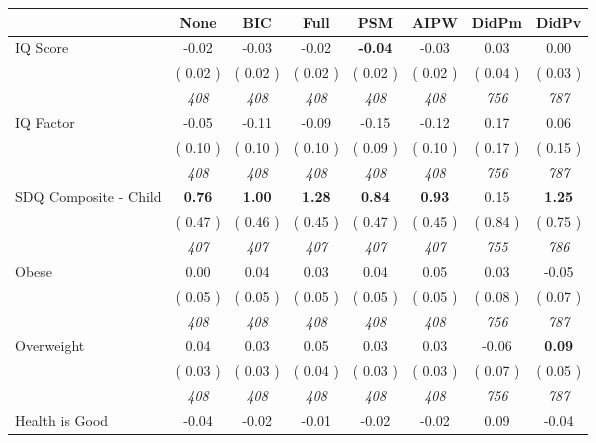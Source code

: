 \begin{tabular}{l c c c c c c c}
\toprule
 & None & BIC & Full & PSM & AIPW & DidPm & DidPv \\
\midrule
IQ Score &     -0.02 &     -0.03 &     -0.02 & \textbf{    -0.04} &     -0.03 &      0.03 &      0.00 \\
& (     0.02 ) & (     0.02 ) & (     0.02 ) & (     0.02 ) & (     0.02 ) & (     0.04 ) & (     0.03 ) \\
& \textit{ 408 } & \textit{ 408 } & \textit{ 408 } & \textit{ 408 } & \textit{ 408 } & \textit{ 756 } & \textit{ 787 } \\
IQ Factor &     -0.05 &     -0.11 &     -0.09 &     -0.15 &     -0.12 &      0.17 &      0.06 \\
& (     0.10 ) & (     0.10 ) & (     0.10 ) & (     0.09 ) & (     0.10 ) & (     0.17 ) & (     0.15 ) \\
& \textit{ 408 } & \textit{ 408 } & \textit{ 408 } & \textit{ 408 } & \textit{ 408 } & \textit{ 756 } & \textit{ 787 } \\
SDQ Composite - Child & \textbf{      0.76 } & \textbf{      1.00 } & \textbf{      1.28 } & \textbf{     0.84} & \textbf{     0.93} &      0.15 & \textbf{      1.25 } \\
& (     0.47 ) & (     0.46 ) & (     0.45 ) & (     0.47 ) & (     0.45 ) & (     0.84 ) & (     0.75 ) \\
& \textit{ 407 } & \textit{ 407 } & \textit{ 407 } & \textit{ 407 } & \textit{ 407 } & \textit{ 755 } & \textit{ 786 } \\
Obese &      0.00 &      0.04 &      0.03 &      0.04 &      0.05 &      0.03 &     -0.05 \\
& (     0.05 ) & (     0.05 ) & (     0.05 ) & (     0.05 ) & (     0.05 ) & (     0.08 ) & (     0.07 ) \\
& \textit{ 408 } & \textit{ 408 } & \textit{ 408 } & \textit{ 408 } & \textit{ 408 } & \textit{ 756 } & \textit{ 787 } \\
Overweight &      0.04 &      0.03 &      0.05 &      0.03 &      0.03 &     -0.06 & \textbf{      0.09 } \\
& (     0.03 ) & (     0.03 ) & (     0.04 ) & (     0.03 ) & (     0.03 ) & (     0.07 ) & (     0.05 ) \\
& \textit{ 408 } & \textit{ 408 } & \textit{ 408 } & \textit{ 408 } & \textit{ 408 } & \textit{ 756 } & \textit{ 787 } \\
Health is Good &     -0.04 &     -0.02 &     -0.01 &     -0.02 &     -0.02 &      0.09 &     -0.04 \\

\end{tabular}
